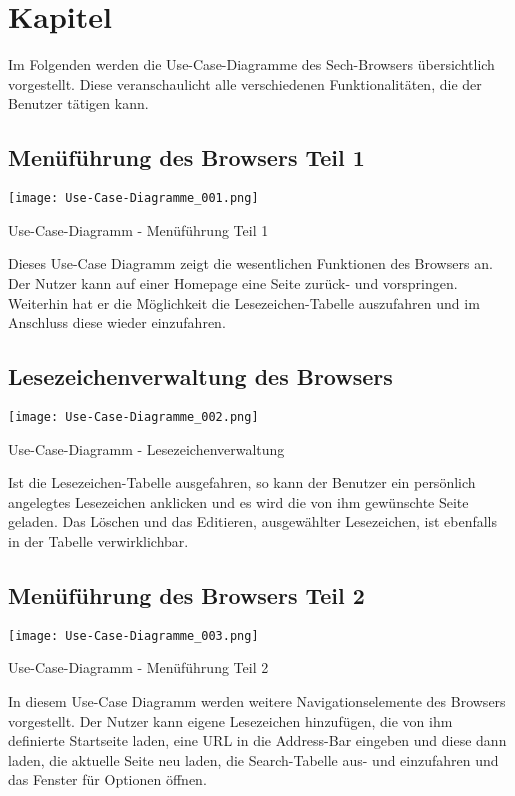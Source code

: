 
\chapter{Kapitel}

Im Folgenden werden die Use-Case-Diagramme des Sech-Browsers übersichtlich vorgestellt. Diese veranschaulicht alle verschiedenen Funktionalitäten, die der Benutzer tätigen kann.

\section{Menüführung des Browsers Teil 1}

\texttt{[image: Use-Case-Diagramme\_001.png]}
	\caption{Use-Case-Diagramm - Menüführung Teil 1}
	\label{fig:Menüführung Teil 1}
	
Dieses Use-Case Diagramm zeigt die wesentlichen Funktionen des Browsers an. Der Nutzer kann auf einer Homepage eine Seite zurück- und vorspringen. Weiterhin hat er die Möglichkeit die Lesezeichen-Tabelle auszufahren und im Anschluss diese wieder einzufahren.

\section{Lesezeichenverwaltung des Browsers}

\texttt{[image: Use-Case-Diagramme\_002.png]}
	\caption{Use-Case-Diagramm - Lesezeichenverwaltung}
	\label{fig:Lesezeichenverwaltung}

Ist die Lesezeichen-Tabelle ausgefahren, so kann der Benutzer ein persönlich angelegtes Lesezeichen anklicken und es wird die von ihm gewünschte Seite geladen. Das Löschen und das Editieren, ausgewählter Lesezeichen, ist ebenfalls in der Tabelle verwirklichbar.

\section{Menüführung des Browsers Teil 2}

\texttt{[image: Use-Case-Diagramme\_003.png]}
	\caption{Use-Case-Diagramm - Menüführung Teil 2}
	\label{fig:Menüführung Teil 2}

In diesem Use-Case Diagramm werden weitere Navigationselemente des Browsers vorgestellt. Der Nutzer kann eigene Lesezeichen hinzufügen, die von ihm definierte Startseite laden, eine URL in die Address-Bar eingeben und diese dann laden, die aktuelle Seite neu laden, die Search-Tabelle aus- und einzufahren und das Fenster für Optionen öffnen.

